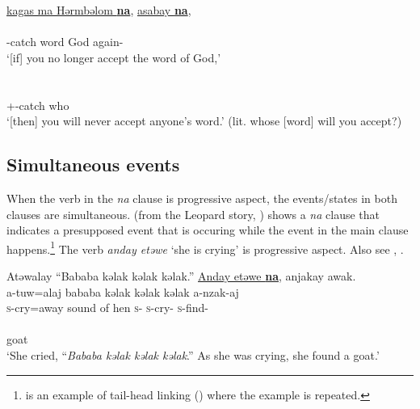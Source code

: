       \medskip
\underline{kagas  ma  Hərmbəlom  \textbf{na}},  \underline{asabay  \textbf{na}},\\      
\gll {}          \\ 
     {\twoS}-catch   word     God {\PSP}  again-{\NEG}  {\PSP} \\
\glt ‘[if] you no longer accept the word of God,’\\ 

        \\      
 \\ 
     {\twoS}+{\POT}-catch  {\PSP}   {\POSS}  who  \\
\glt  ‘[then] you will never accept anyone's word.' (lit. whose [word] will you accept?)\\
\z

\subsection{Simultaneous events}\label{sec:11.1.2}
\hypertarget{RefHeading1213201525720847}{}
When the verb in the \textit{na} clause is progressive aspect, the events/states in both clauses are simultaneous.  (from the Leopard story, \citealt{Friesen2003}) shows a \textit{na} clause that indicates a presupposed event that is occuring while the event in the main clause happens.\footnote{ is an example of tail-head linking () where the example is repeated.} The verb \textit{anday etəwe}  ‘she is crying’ is progressive aspect. Also see , . 

\ea \label{ex:11:20}
Atəwalay  “Bababa  kəlak  kəlak  kəlak.”  \underline{Anday  etəwe  \textbf{na}},  anjakay  awak.\\
\gll  a-tuw=alaj  {bababa  kəlak kəlak kəlak}      {a-nzak-aj}\\ 
      \textsc{s}-cry=away    {sound of hen}      \textsc{s}-{\PRG}  \textsc{s}-cry-{\CL}  {\PSP}  \textsc{s}-find{}-{\CL}\\  
     
      \medskip
{}\\      
     goat\\
\glt  ‘She cried, “\textit{Bababa kəlak kəlak kəlak}.” As she was crying, she found a goat.’ 
\z
{}
